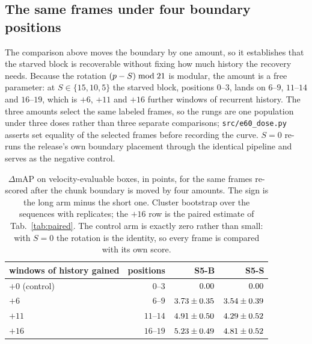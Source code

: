 \documentclass[10pt,twocolumn,letterpaper]{article}
\begin{document}
\subsection{The same frames under four boundary positions}
\label{sup:dose}

The comparison above moves the boundary by one amount, so it establishes that the starved
block is recoverable without fixing how much history the recovery needs. Because the
rotation $(p-S)\bmod21{}$ is modular, the amount is a free parameter: at
$S\in\{15,10,5\}$ the starved block, positions $0$--$3$, lands on $6$--$9$, $11$--$14$ and
$16$--$19$, which is $+6$, $+11$ and $+16$ further windows of recurrent history. The three
amounts select the same \ssmDoseN{} labeled frames, so the rungs are one population under
three doses rather than three separate comparisons; \texttt{src/e60\_dose.py} asserts set
equality of the selected frames before recording the curve. $S=0$ re-runs the release's own
boundary placement through the identical pipeline and serves as the negative control.

\begin{table}[h]
\centering\footnotesize
\setlength{\tabcolsep}{3.0pt}\renewcommand{\arraystretch}{0.95}
\begin{tabular}{lrrr}
\toprule
windows of history gained & positions & S5-B & S5-S \\
\midrule
$+0$ (control) & $0$--$3$ & $0.00$ & $0.00$ \\
$+6$ & $6$--$9$ & $3.73\pm0.35$ & $3.54\pm0.39$ \\
$+11$ & $11$--$14$ & $4.91\pm0.50$ & $4.29\pm0.52$ \\
$+16$ & $16$--$19$ & $5.23\pm0.49$ & $4.81\pm0.52$ \\
\bottomrule
\end{tabular}
\caption{$\Delta$mAP on velocity-evaluable boxes, in points, for the same \ssmDoseN{}
frames re-scored after the chunk boundary is moved by four amounts. The sign is the long
arm minus the short one. Cluster bootstrap over the \outSeqsScanned{} sequences with
\ssmPairedB{} replicates; the $+16$ row is the paired estimate of Tab.~\ref{tab:paired}.
The control arm is exactly zero rather than small: with $S=0$ the rotation is the identity,
so every frame is compared with its own score.}
\label{tab:dose}
\end{table}
\end{document}
